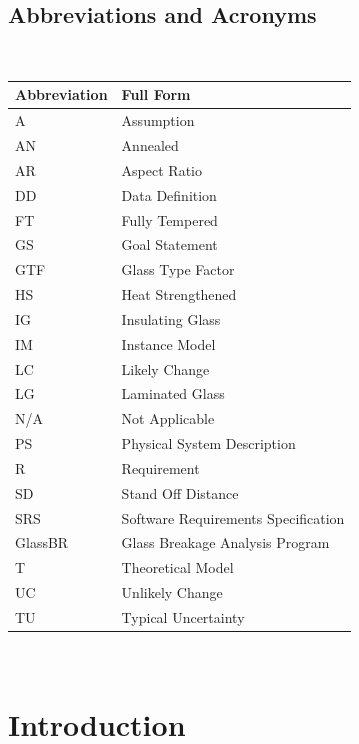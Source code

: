 \documentclass[12pt]{article}
\newcommand{\progname}{GlassBR}
\begin{document}
\subsection{Abbreviations and Acronyms} \label{sec_abbrev}

~\newline \renewcommand{\arraystretch}{1.2}
\noindent 
\begin{tabular}{l l } \toprule
  \textbf{Abbreviation} & \textbf{Full Form}\\
  \midrule
  A & Assumption\\
  AN & Annealed\\
  AR & Aspect Ratio\\
  DD & Data Definition\\
  FT & Fully Tempered\\
  GS & Goal Statement\\
  GTF & Glass Type Factor\\
  HS & Heat Strengthened \\
  IG & Insulating Glass \\
  IM & Instance Model\\
  LC & Likely Change\\
  LG & Laminated Glass\\
  N/A & Not Applicable\\
  PS & Physical System Description\\
  R & Requirement\\
  SD & Stand Off Distance\\
  SRS & 	Software Requirements Specification\\
  \progname\ & Glass Breakage Analysis Program\\
  T & Theoretical Model\\
  UC & Unlikely Change\\
  TU & 	Typical Uncertainty\\
  \bottomrule
\end{tabular}

\newpage

\tableofcontents

~\newpage


\setlength{\tabcolsep}{6pt}

\section{Introduction}
\end{document}
